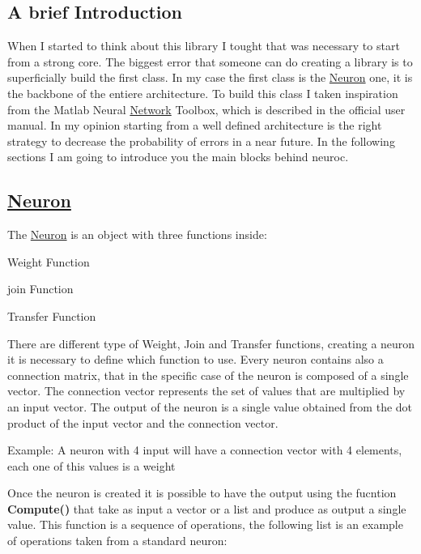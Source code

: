 \subsection*{A brief Introduction }

When I started to think about this library I tought that was necessary to start from a strong core. The biggest error that someone can do creating a library is to superficially build the first class. In my case the first class is the \hyperlink{class_neuron}{Neuron} one, it is the backbone of the entiere architecture. To build this class I taken inspiration from the Matlab Neural \hyperlink{class_network}{Network} Toolbox, which is described in the official user manual. In my opinion starting from a well defined architecture is the right strategy to decrease the probability of errors in a near future. In the following sections I am going to introduce you the main blocks behind neuroc.

\subsection*{\hyperlink{class_neuron}{Neuron} }

The \hyperlink{class_neuron}{Neuron} is an object with three functions inside\-:


\begin{DoxyEnumerate}
\item Weight Function
\item join Function
\item Transfer Function
\end{DoxyEnumerate}

There are different type of Weight, Join and Transfer functions, creating a neuron it is necessary to define which function to use. Every neuron contains also a connection matrix, that in the specific case of the neuron is composed of a single vector. The connection vector represents the set of values that are multiplied by an input vector. The output of the neuron is a single value obtained from the dot product of the input vector and the connection vector.

Example\-: A neuron with 4 input will have a connection vector with 4 elements, each one of this values is a weight

Once the neuron is created it is possible to have the output using the fucntion {\bfseries Compute()} that take as input a vector or a list and produce as output a single value. This function is a sequence of operations, the following list is an example of operations taken from a standard neuron\-:

